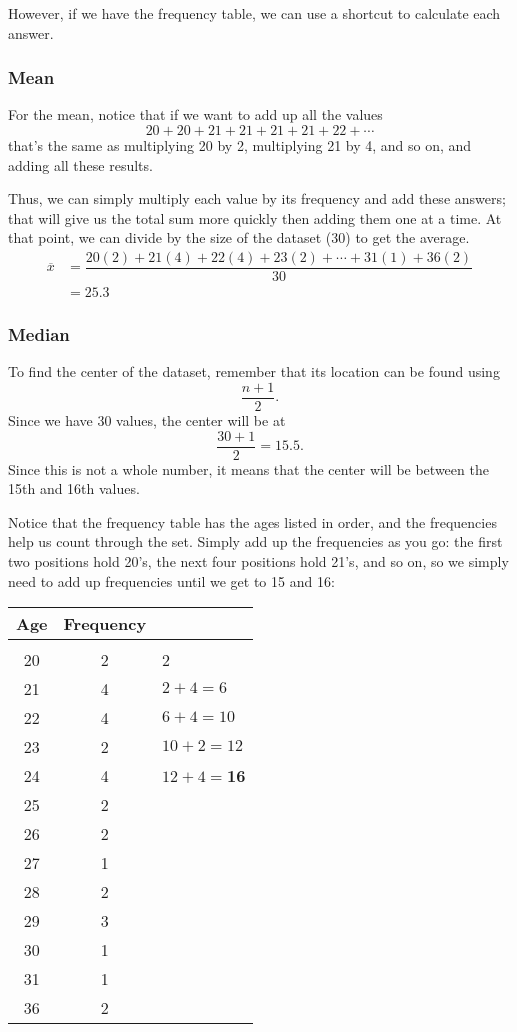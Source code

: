However, if we have the frequency table, we can use a shortcut to calculate each answer.

\subsubsection{Mean}
For the mean, notice that if we want to add up all the values
\[20 + 20 + 21 + 21 + 21 + 21 + 22 + \cdots\]
that's the same as multiplying 20 by 2, multiplying 21 by 4, and so on, and adding all these results.

Thus, we can simply multiply each value by its frequency and add these answers; that will give us the total sum more quickly then adding them one at a time.  At that point, we can divide by the size of the dataset (30) to get the average.
\begin{align*}
\overline{x} &= \dfrac{20(2) + 21(4) + 22(4) + 23(2) + \cdots + 31(1) + 36(2)}{30}\\
&= 25.3
\end{align*}

\subsubsection{Median}
To find the center of the dataset, remember that its location can be found using
\[\dfrac{n+1}{2}.\]
Since we have 30 values, the center will be at 
\[\dfrac{30+1}{2} = 15.5.\]
Since this is not a whole number, it means that the center will be between the 15th and 16th values.

Notice that the frequency table has the ages listed in order, and the frequencies help us count through the set.  Simply add up the frequencies as you go: the first two positions hold 20's, the next four positions hold 21's, and so on, so we simply need to add up frequencies until we get to 15 and 16:
\begin{center}
\begin{tabular}{c c l}
\textbf{Age} & \textbf{Frequency} & \\
\hline
& & \\
20 & 2 & {\color{red} 2}\\
21 & 4 & {\color{red} $2+4=6$}\\
22 & 4 & {\color{red} $6+4=10$}\\
23 & 2 & {\color{red} $10+2=12$}\\
24 & 4 & {\color{red} $12+4=$}{\LARGE\bfseries\color{red}16}\\
25 & 2 & \\
26 & 2 & \\
27 & 1 & \\
28 & 2 & \\
29 & 3 & \\
30 & 1 & \\
31 & 1 & \\
36 & 2
\end{tabular}
\end{center}

